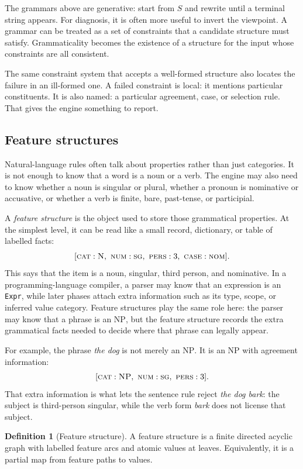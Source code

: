 \documentclass[11pt]{article}
\theoremstyle{definition}
\newtheorem{definition}{Definition}[section]
\theoremstyle{plain}
\theoremstyle{remark}
\begin{document}
The grammars above are generative: start from $S$ and rewrite until a terminal string appears.
For diagnosis, it is often more useful to invert the viewpoint. A grammar can be treated as a
set of constraints that a candidate structure must satisfy. Grammaticality becomes the existence
of a structure for the input whose constraints are all consistent.

The same constraint system that accepts a well-formed structure also locates the
failure in an ill-formed one. A failed constraint is local: it mentions particular
constituents. It is also named: a particular agreement, case, or selection rule. That
gives the engine something to report.
\subsection{Feature structures}

Natural-language rules often talk about properties rather than just categories.
It is not enough to know that a word is a noun or a verb. The engine may also
need to know whether a noun is singular or plural, whether a pronoun is
nominative or accusative, or whether a verb is finite, bare, past-tense, or
participial.

A \emph{feature structure} is the object used to store those grammatical
properties. At the simplest level, it can be read like a small record, dictionary,
or table of labelled facts:
\[
  [\textsc{cat}:\textsc{N},\ \textsc{num}:\textsc{sg},\ \textsc{pers}:3,\ 
    \textsc{case}:\textsc{nom}].
\]
This says that the item is a noun, singular, third person, and nominative. In a
programming-language compiler, a parser may know that an expression is an
\texttt{Expr}, while later phases attach extra information such as its type,
scope, or inferred value category. Feature structures play the same role here:
the parser may know that a phrase is an \textsc{NP}, but the feature structure
records the extra grammatical facts needed to decide where that phrase can
legally appear.

For example, the phrase \textit{the dog} is not merely an \textsc{NP}. It is an
\textsc{NP} with agreement information:
\[
  [\textsc{cat}:\textsc{NP},\ \textsc{num}:\textsc{sg},\ \textsc{pers}:3].
\]
That extra information is what lets the sentence rule reject \textit{the dog
bark}: the subject is third-person singular, while the verb form \textit{bark}
does not license that subject.

\begin{definition}[Feature structure]
A feature structure is a finite directed acyclic graph with labelled feature
arcs and atomic values at leaves. Equivalently, it is a partial map from feature
paths to values.
\end{definition}
\end{document}
